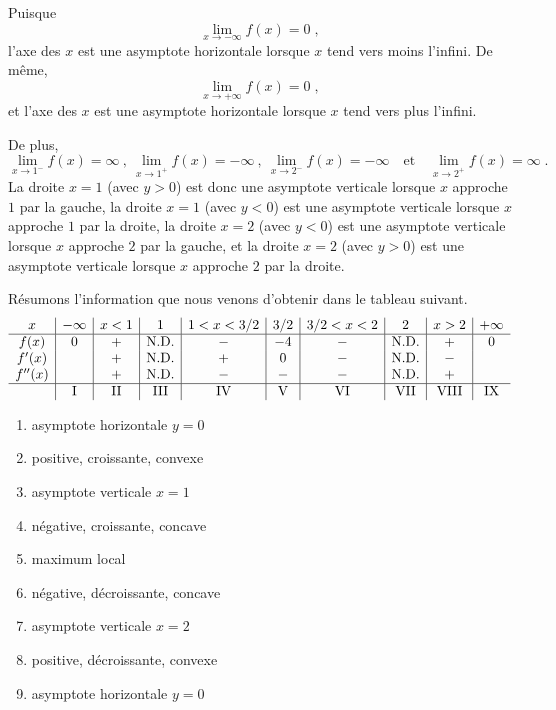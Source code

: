 {\begin{egg}
Puisque
\[
\lim_{x\rightarrow -\infty} f(x) = 0  \; ,
\]
l'axe des $x$ est une asymptote horizontale lorsque $x$ tend vers
moins l'infini.  De même,
\[
\lim_{x\rightarrow +\infty} f(x) = 0  \; ,
\]
et l'axe des $x$ est une asymptote horizontale lorsque $x$ tend
vers plus l'infini.

De plus,
\[
\lim_{x\rightarrow 1^-} f(x) = \infty \ , \ 
\lim_{x\rightarrow 1^+} f(x) = -\infty \ , \ 
\lim_{x\rightarrow 2^-} f(x) = -\infty \quad \text{et} \quad
\lim_{x\rightarrow 2^+} f(x) = \infty \; .
\]
La droite $x=1$ (avec $y>0$) est donc une asymptote verticale lorsque
$x$ approche $1$ par la gauche, la droite $x=1$ (avec $y<0$) est une
asymptote verticale lorsque $x$ approche $1$ par la droite, la droite
$x=2$ (avec $y<0$) est une asymptote verticale lorsque $x$ approche
$2$ par la gauche, et la droite $x=2$ (avec $y>0$) est une asymptote
verticale lorsque $x$ approche $2$ par la droite.

Résumons l'information que nous venons d'obtenir dans le tableau suivant.
\[
\begin{array}{c|c|c|c|c|c|c|c|c|c}
x & -\infty & x<1 & 1 & 1<x<3/2 & 3/2 & 3/2<x<2 & 2 & x>2 & +\infty \\
\hline
f(x) & 0 & + & \text{N.D.} & - &  -4 & - & \text{N.D.} & + & 0 \\
f'(x) &  & + & \text{N.D.} & + & 0 & - & \text{N.D.} & - & \\
f''(x) &  & + & \text{N.D.} & - & - & - & \text{N.D.} & + & \\
\hline
& \text{I} & \text{II} & \text{III} & \text{IV} & \text{V} & \text{VI}
& \text{VII}& \text{VIII} & \text{IX}
\end{array}
\]

\begin{minipage}{0.9\textwidth}
\begin{multicols}{2}
\renewcommand{\labelenumi}{\Roman{enumi}:}
\begin{enumerate}
\item asymptote horizontale $y=0$
\item positive, croissante, convexe
\item asymptote verticale $x=1$
\item négative, croissante, concave
\item maximum local
\item négative, décroissante, concave
\item asymptote verticale $x=2$
\item positive, décroissante, convexe
\item asymptote horizontale $y=0$
\end{enumerate}
\vspace*{1em}
\end{multicols}
\end{minipage}
\vspace{1ex}


\end{egg}}

